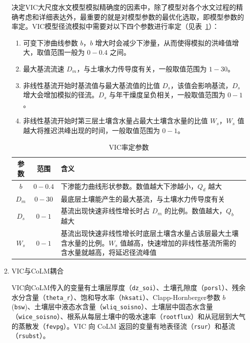 \begin{enumerate}
    决定VIC大尺度水文模型模拟精确度的因素中，除了模型对各个水文过程的精确考虑和详细表达外，最重要的就是对模型参数的最优化选取，即模型参数的率定。VIC模型径流模拟中需要对以下四个参数进行率定（见表~\ref{tab:VIC率定参数}）：
    \begin{enumerate}
      \item 可变下渗曲线参数 $b$，$b$ 增大时会减少下渗量，从而使得模拟的洪峰值增大，取值范围一般为 $0-0.4$ 之间。
      \item 最大基流流速 $D_m$，与土壤水力传导度有关，一般取值范围为 $1-30$。
      \item 非线性基流开始时基流值与最大基流值的比值 $D_s$，该值会影响基流，$D_s$ 增大会增加模拟的径流。$D_s$ 与年干燥度呈负相关，一般取值范围为 $0-1$。
      \item 非线性基流开始时第三层土壤含水量占最大土壤含水量的比值 $W_s$，$W_s$ 值越大将推迟洪峰出现的时间，一般取值范围为 $0-1$。
    \end{enumerate}
    {
      \begin{table}[htbp]
        \centering \renewcommand{\arraystretch}{1.5}
        \caption{VIC率定参数}
        \begin{tabular}{ccp{12cm}}
          \toprule
          参数  & 范围    & 含义                                                                                                                                   \\ \midrule
          $b$   & $0-0.4$ & 下渗能力曲线形状参数。数值越大下渗越小，$Q_d$ 越大                                                                                     \\
          $D_m$ & $0-30$  & 最底层土壤能产生的最大基流，与土壤水力传导度有关                                                                                       \\
          $D_s$ & $0-1$   & 基流出现快速非线性增长时占 $D_m$ 的比例。数值越大，$Q_b$ 越大                                                                          \\
          $W_s$ & $0-1$   & 基流出现快速非线性增长时底层土壤含水量占该层最大土壤含水量的比例。$W_s$ 值越高，快速增加的非线性基流所需的含水量就越高，将延迟径流峰值 \\
          \bottomrule
        \end{tabular}
        \label{tab:VIC率定参数}
      \end{table}
    }

  \item VIC与CoLM耦合

    VIC向CoLM传入的变量有土壤层厚度（\texttt{dz\_soi}）、土壤孔隙度（\texttt{porsl}）、残余水分含量（\texttt{theta\_r}）、饱和导水率（\texttt{hksati}）、Clapp-Hornberger参数 $b$(\texttt{bsw})、土壤层中液态水含量（\texttt{wliq\_soisno}）、土壤层中固态水含量（\texttt{wice\_soisno}）、根系从每层土壤中的吸水速率（\texttt{rootflux}）和从冠层到大气的蒸散发（\texttt{fevpg}）。VIC 向 CoLM 返回的变量有地表径流（\texttt{rsur}）和基流（\texttt{rsubst}）。


\end{enumerate}
